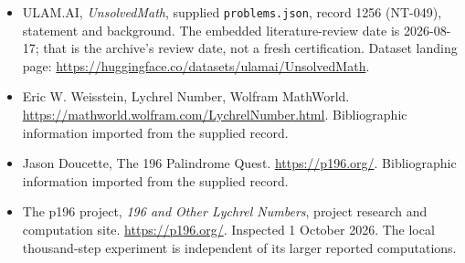 \documentclass[11pt,a4paper]{article}
\begin{document}
{\small

\begin{itemize}

\item[\hypertarget{source:1256:1}{S1}] ULAM.AI, \emph{UnsolvedMath}, supplied \texttt{problems.json}, record 1256 (NT-049), statement and background. The embedded literature-review date is 2026-08-17; that is the archive’s review date, not a fresh certification. Dataset landing page: \url{https://huggingface.co/datasets/ulamai/UnsolvedMath}.

\item[\hypertarget{source:1256:2}{S2}] Eric W. Weisstein, Lychrel Number, Wolfram MathWorld. \url{https://mathworld.wolfram.com/LychrelNumber.html}. Bibliographic information imported from the supplied record.

\item[\hypertarget{source:1256:3}{S3}] Jason Doucette, The 196 Palindrome Quest. \url{https://p196.org/}. Bibliographic information imported from the supplied record.


\item[E1] The p196 project, \emph{196 and Other Lychrel Numbers},
project research and computation site. \url{https://p196.org/}.
Inspected 1 October 2026. The local thousand-step experiment is
independent of its larger reported computations.

\end{itemize}

}

\label{end:1256}
\end{document}
